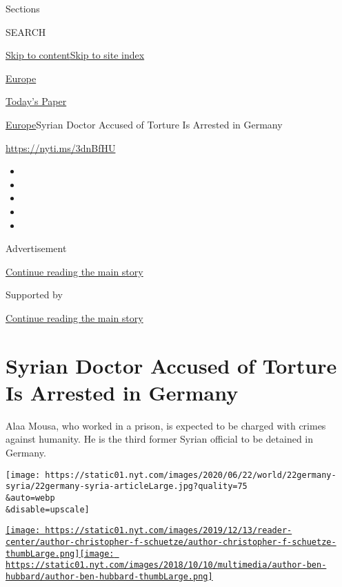 Sections

SEARCH

\protect\hyperlink{site-content}{Skip to
content}\protect\hyperlink{site-index}{Skip to site index}

\href{https://www.nytimes.com/section/world/europe}{Europe}

\href{https://myaccount.nytimes.com/auth/login?response_type=cookie\&client_id=vi}{}

\href{https://www.nytimes.com/section/todayspaper}{Today's Paper}

\href{/section/world/europe}{Europe}\textbar{}Syrian Doctor Accused of
Torture Is Arrested in Germany

\url{https://nyti.ms/3dnBfHU}

\begin{itemize}
\item
\item
\item
\item
\item
\end{itemize}

Advertisement

\protect\hyperlink{after-top}{Continue reading the main story}

Supported by

\protect\hyperlink{after-sponsor}{Continue reading the main story}

\hypertarget{syrian-doctor-accused-of-torture-is-arrested-in-germany}{%
\section{Syrian Doctor Accused of Torture Is Arrested in
Germany}\label{syrian-doctor-accused-of-torture-is-arrested-in-germany}}

Alaa Mousa, who worked in a prison, is expected to be charged with
crimes against humanity. He is the third former Syrian official to be
detained in Germany.

\texttt{[image: https://static01.nyt.com/images/2020/06/22/world/22germany-syria/22germany-syria-articleLarge.jpg?quality=75\\\&auto=webp\\\&disable=upscale]}

\href{https://www.nytimes.com/by/christopher-f-schuetze}{\texttt{[image: https://static01.nyt.com/images/2019/12/13/reader-center/author-christopher-f-schuetze/author-christopher-f-schuetze-thumbLarge.png]}}\href{https://www.nytimes.com/by/ben-hubbard}{\texttt{[image: https://static01.nyt.com/images/2018/10/10/multimedia/author-ben-hubbard/author-ben-hubbard-thumbLarge.png]}}

